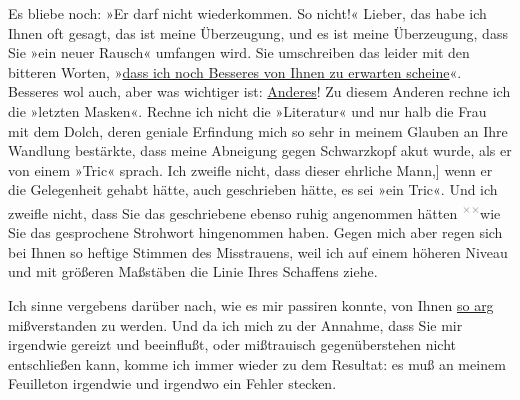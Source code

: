 \pstart
           Es bliebe noch: »Er darf nicht
                  wiederkommen. So nicht!« Lieber, das habe ich Ihnen oft gesagt, das ist meine
               Überzeugung, und es ist meine Überzeugung, dass Sie »ein neuer Rausch« umfangen wird.
               Sie umschreiben das \introOben{}leider\introOben{} mit den bitteren Worten, »\uline{dass ich noch Besseres \strikeout{\textcolor{gray}{×}} von Ihnen zu erwarten scheine}«. Besseres wol auch, aber was wichtiger
               ist: \uline{Anderes}! Zu diesem Anderen rechne ich die »letzten Masken«. Rechne ich nicht die »Literatur« und nur halb die Frau mit dem Dolch, deren geniale Erfindung mich so sehr in
               meinem Glauben an Ihre Wandlung bestärkte, dass meine Abneigung gegen Schwarzkopf akut wurde, als er von einem »Tric«
               sprach. Ich zweifle nicht, dass dieser ehrliche Mann\pwindex{Schwarzkopf, Gustav 07.11.1853 – 13.11.1939@\textsc{Schwarzkopf, Gustav} (07.11.1853 – 13.11.1939), \emph{Schriftsteller/Schriftstellerin}|pwv}{[},{]} wenn er die Gelegenheit gehabt hätte, auch geschrieben hätte,
               es sei »ein Tric«. Und ich zweifle nicht, dass Sie das geschriebene ebenso ruhig
               angenommen hätten \substVorne{}\textsuperscript{\textcolor{gray}{×}\-\textcolor{gray}{×}}\substDazwischen{}wie\substHinten{} Sie das gesprochene Strohwort hingenommen haben. Gegen mich aber regen sich
               bei Ihnen so heftige Stimmen des Misstrauens, weil ich auf einem höheren Niveau und
               mit größeren Maßstäben \strikeout{\textcolor{gray}{von Ihrem}{ }\textcolor{gray}{×}\-\textcolor{gray}{×}\-\textcolor{gray}{×}\-\textcolor{gray}{×}{ }\textcolor{gray}{×}\-\textcolor{gray}{×}\-\textcolor{gray}{×}\-\textcolor{gray}{×}\-\textcolor{gray}{×},} die Linie Ihres
               Schaffens ziehe.\pend
           
\pstart
           Ich sinne vergebens darüber nach, wie es mir passiren konnte, von Ihnen \uline{so arg} mißverstanden zu werden. Und da ich mich zu der
               Annahme, dass Sie mir irgendwie gereizt und beeinflußt, oder mißtrauisch
               gegenüberstehen nicht entschließen kann, komme ich immer wieder zu dem Resultat: es
               muß an meinem Feuilleton
               irgendwie und irgendwo {\pb}ein
               Fehler stecken.\pend
           

